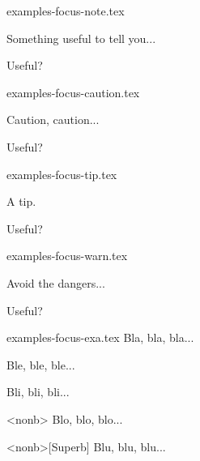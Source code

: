 \begin{filecontents*}[overwrite]{examples-focus-note.tex}
\begin{tdocnote}
    Something useful to tell you...
\end{tdocnote}

\begin{tdocnote}
    Useful?
\end{tdocnote}
\end{filecontents*}


\begin{filecontents*}[overwrite]{examples-focus-caution.tex}
\begin{tdoccaution}
    Caution, caution...
\end{tdoccaution}

\begin{tdoccaution}
    Useful?
\end{tdoccaution}
\end{filecontents*}


\begin{filecontents*}[overwrite]{examples-focus-tip.tex}
\begin{tdoctip}
    A tip.
\end{tdoctip}

\begin{tdoctip}
    Useful?
\end{tdoctip}
\end{filecontents*}


\begin{filecontents*}[overwrite]{examples-focus-warn.tex}
\begin{tdocwarn}
    Avoid the dangers...
\end{tdocwarn}

\begin{tdocwarn}
    Useful?
\end{tdocwarn}
\end{filecontents*}


\begin{filecontents*}[overwrite]{examples-focus-exa.tex}
Bla, bla, bla...

\begin{tdocexa}
    Ble, ble, ble...
\end{tdocexa}

\begin{tdocexa}[Wonderful]
    Bli, bli, bli...
\end{tdocexa}

\begin{tdocexa}<nonb>
    Blo, blo, blo...
\end{tdocexa}

\begin{tdocexa}<nonb>[Superb]
    Blu, blu, blu...
\end{tdocexa}
\end{filecontents*}


